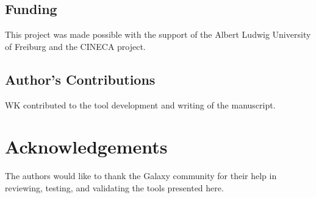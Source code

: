 \documentclass[a4paper,num-refs]{oup-contemporary}
\begin{document}
\subsection{Funding}
This project was made possible with the support of the Albert Ludwig University of Freiburg and the CINECA project.


\subsection{Author's Contributions}
WK contributed to the tool development and writing of the manuscript.


\section{Acknowledgements}
The authors would like to thank the Galaxy community for their help in reviewing, testing, and validating the tools presented here.


\end{document}
